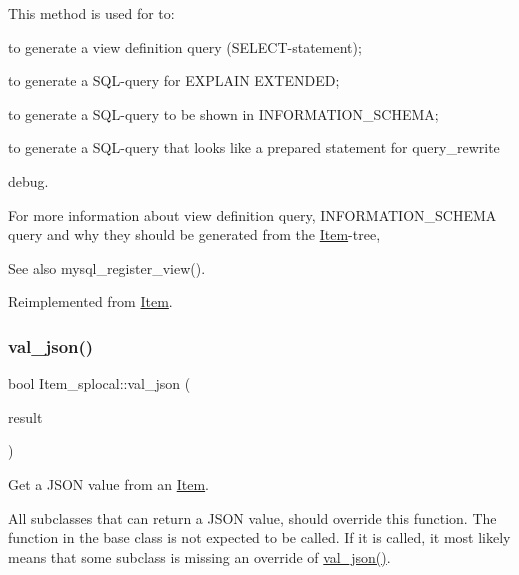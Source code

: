 This method is used for to\+:
\begin{DoxyItemize}
\item to generate a view definition query (S\+E\+L\+E\+CT-\/statement);
\item to generate a S\+QL-\/query for E\+X\+P\+L\+A\+IN E\+X\+T\+E\+N\+D\+ED;
\item to generate a S\+QL-\/query to be shown in I\+N\+F\+O\+R\+M\+A\+T\+I\+O\+N\+\_\+\+S\+C\+H\+E\+MA;
\item to generate a S\+QL-\/query that looks like a prepared statement for query\+\_\+rewrite
\item debug.
\end{DoxyItemize}

For more information about view definition query, I\+N\+F\+O\+R\+M\+A\+T\+I\+O\+N\+\_\+\+S\+C\+H\+E\+MA query and why they should be generated from the \mbox{\hyperlink{classItem}{Item}}-\/tree, \begin{DoxySeeAlso}{See also}
mysql\+\_\+register\+\_\+view(). 
\end{DoxySeeAlso}


Reimplemented from \mbox{\hyperlink{classItem_aa7ba4bde739d83adec8edf3bf1596d94}{Item}}.

\mbox{\label{classItem__splocal_a4417b9609600a6583814a12ef594a3b5}} 
\subsubsection{\texorpdfstring{val\+\_\+json()}{val\_json()}}
{\footnotesize\ttfamily bool Item\+\_\+splocal\+::val\+\_\+json (\begin{DoxyParamCaption}\item[{\mbox{\hyperlink{classJson__wrapper}{Json\+\_\+wrapper}} $\ast$}]{result }\end{DoxyParamCaption})\hspace{0.3cm}{\ttfamily [virtual]}}

Get a J\+S\+ON value from an \mbox{\hyperlink{classItem}{Item}}.

All subclasses that can return a J\+S\+ON value, should override this function. The function in the base class is not expected to be called. If it is called, it most likely means that some subclass is missing an override of \mbox{\hyperlink{classItem__splocal_a4417b9609600a6583814a12ef594a3b5}{val\+\_\+json()}}.


